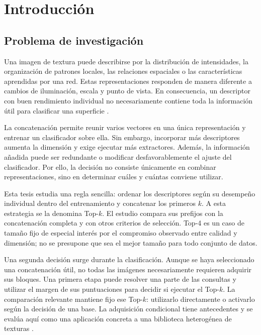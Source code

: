 \chapter{Introducción}\label{sec:introduccion}

\section{Problema de investigación}
Una imagen de textura puede describirse por la distribución de intensidades, la organización de patrones locales, las relaciones espaciales o las características aprendidas por una red. Estas representaciones responden de manera diferente a cambios de iluminación, escala y punto de vista. En consecuencia, un descriptor con buen rendimiento individual no necesariamente contiene toda la información útil para clasificar una superficie \citep{liu2019survey,cimpoi2016fisher}.

La concatenación permite reunir varios vectores en una única representación y entrenar un clasificador sobre ella. Sin embargo, incorporar más descriptores aumenta la dimensión y exige ejecutar más extractores. Además, la información añadida puede ser redundante o modificar desfavorablemente el ajuste del clasificador. Por ello, la decisión no consiste únicamente en combinar representaciones, sino en determinar cuáles y cuántas conviene utilizar.

Esta tesis estudia una regla sencilla: ordenar los descriptores según su desempeño individual dentro del entrenamiento y concatenar los primeros \(k\). A esta estrategia se la denomina Top-\(k\). El estudio compara sus prefijos con la concatenación completa y con otros criterios de selección. Top-4 es un caso de tamaño fijo de especial interés por el compromiso observado entre calidad y dimensión; no se presupone que sea el mejor tamaño para todo conjunto de datos.

Una segunda decisión surge durante la clasificación. Aunque se haya seleccionado una concatenación útil, no todas las imágenes necesariamente requieren adquirir sus bloques. Una primera etapa puede resolver una parte de las consultas y utilizar el margen de sus puntuaciones para decidir si ejecutar el Top-\(k\). La comparación relevante mantiene fijo ese Top-\(k\): utilizarlo directamente o activarlo según la decisión de una base. La adquisición condicional tiene antecedentes y se evalúa aquí como una aplicación concreta a una biblioteca heterogénea de texturas \citep{nan2017adaptive,han2021dynamic}.

